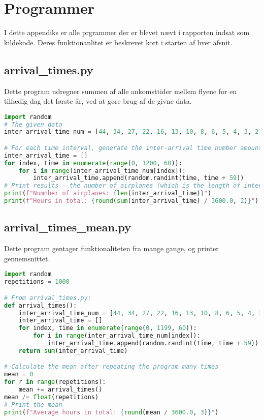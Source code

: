\chapter{Programmer}
I dette appendiks er alle prgrammer der er blevet nævt i rapporten indsat som kildekode.
Deres funktionanlitet er beskrevet kort i starten af hver afsnit.

\section{arrival\_times.py}
Dette program udregner summen af alle ankomsttider mellem flyene for en tilfædig dag det første år, ved at gøre brug af de givne data.

\begin{lstlisting}[language=Python, caption={arrival\_times.py}]
import random
# The given data
inter_arrival_time_num = [44, 34, 27, 22, 16, 13, 10, 8, 6, 5, 4, 3, 2, 2, 1, 1, 1, 0, 1, 0]

# For each time interval, generate the inter-arrival time number amount of inter-arrival times in this interval
inter_arrival_time = []
for index, time in enumerate(range(0, 1200, 60)):
    for i in range(inter_arrival_time_num[index]):
        inter_arrival_time.append(random.randint(time, time + 59))
# Print results - the number of airplanes (which is the length of inter_arrival_times, and the sum of inter-arrival times in hours
print(f"Numnber of airplanes: {len(inter_arrival_time)}")
print(f"Hours in total: {round(sum(inter_arrival_time) / 3600.0, 2)}")
\end{lstlisting}

\section{arrival\_times\_mean.py}
Dette program gentager funktionaliteten fra  mange gange, og printer gennemsnittet.

\begin{lstlisting}[language=Python, caption={arrival\_times\_mean.py}]
import random
repetitions = 1000

# From arrival_times.py:
def arrival_times():
    inter_arrival_time_num = [44, 34, 27, 22, 16, 13, 10, 8, 6, 5, 4, 3, 2, 2, 1, 1, 1, 0, 1, 0]
    inter_arrival_time = []
    for index, time in enumerate(range(0, 1199, 60)):
        for i in range(inter_arrival_time_num[index]):
            inter_arrival_time.append(random.randint(time, time + 59))
    return sum(inter_arrival_time)

# Calculate the mean after repeating the program many times
mean = 0
for r in range(repetitions):
    mean += arrival_times()
mean /= float(repetitions)
# Print the mean
print(f"Average hours in total: {round(mean / 3600.0, 3)}")
\end{lstlisting}

